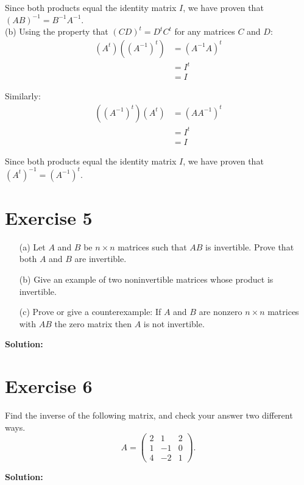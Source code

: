 \documentclass{article}
\begin{document}
Since both products equal the identity matrix $I$, we have proven that $(AB)^{-1} = B^{-1}A^{-1}$. \\

(b)
Using the property that $(CD)^t = D^t C^t$ for any matrices $C$ and $D$:
\begin{align*}
(A^t)((A^{-1})^t) &= (A^{-1}A)^t \\
&= I^t \\
&= I
\end{align*}

Similarly:
\begin{align*}
((A^{-1})^t)(A^t) &= (AA^{-1})^t \\
&= I^t \\
&= I
\end{align*}

Since both products equal the identity matrix $I$, we have proven that $(A^t)^{-1} = (A^{-1})^t$.

\newpage

\section*{Exercise 5}
\begin{enumerate}
\item[(a)] Let $A$ and $B$ be $n \times n$ matrices such that $AB$ is invertible. Prove that both $A$ and $B$ are invertible.
\item[(b)] Give an example of two noninvertible matrices whose product is invertible.
\item[(c)] Prove or give a counterexample: If $A$ and $B$ are nonzero $n \times n$ matrices with $AB$ the zero matrix then $A$ is not invertible.
\end{enumerate}

\textbf{Solution: } \\



\newpage

\section*{Exercise 6}
Find the inverse of the following matrix, and check your answer two different ways.
$$A = \begin{pmatrix} 2 & 1 & 2 \\ 1 & -1 & 0 \\ 4 & -2 & 1 \end{pmatrix}.$$

\textbf{Solution: } \\
\end{document}

